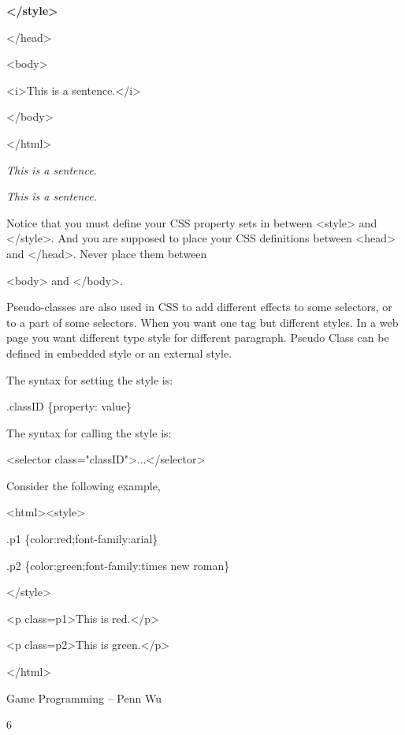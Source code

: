 \documentclass[
]{article}
\begin{document}
\textbf{\textless/style\textgreater{}}

\textless/head\textgreater{}

\textless body\textgreater{}

\textless i\textgreater This is a sentence.\textless/i\textgreater{}

\textless/body\textgreater{}

\textless/html\textgreater{}

\emph{This is a sentence.}

\emph{This is a sentence.}

Notice that you must define your CSS property sets in between
\textless style\textgreater{} and \textless/style\textgreater. And you
are supposed to place your CSS definitions between
\textless head\textgreater{} and \textless/head\textgreater. Never place
them between

\textless body\textgreater{} and \textless/body\textgreater.

Pseudo-classes are also used in CSS to add different effects to some
selectors, or to a part of some selectors. When you want one tag but
different styles. In a web page you want different type style for
different paragraph. Pseudo Class can be defined in embedded style or an
external style.

The syntax for setting the style is:

.classID \{property: value\}

The syntax for calling the style is:

\textless selector
class="classID"\textgreater...\textless/selector\textgreater{}

Consider the following example,

\textless html\textgreater\textless style\textgreater{}

.p1 \{color:red;font-family:arial\}

.p2 \{color:green;font-family:times new roman\}

\textless/style\textgreater{}

\textless p class=p1\textgreater This is red.\textless/p\textgreater{}

\textless p class=p2\textgreater This is green.\textless/p\textgreater{}

\textless/html\textgreater{}

Game Programming -- Penn Wu

6

\protect\hypertarget{index_split_001.htmlux5cux23p7}{}{}
\end{document}
